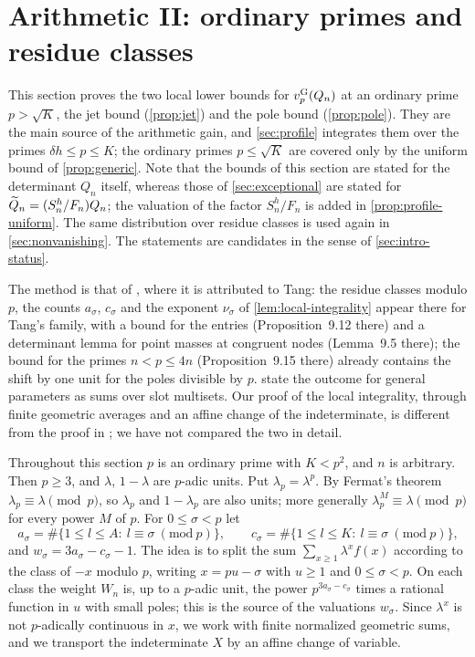 \section{Arithmetic II: ordinary primes and residue classes}\label{sec:ordinary}

This section proves the two local lower bounds for $v^{\mathrm{G}}_{p}(Q_n)$ at an ordinary prime $p>\sqrt K$, the jet bound (\cref{prop:jet}) and the pole bound (\cref{prop:pole}). They are the main source of the arithmetic gain, and \cref{sec:profile} integrates them over the primes $\delta h\le p\le K$; the ordinary primes $p\le\sqrt K$ are covered only by the uniform bound of \cref{prop:generic}. Note that the bounds of this section are stated for the determinant $Q_n$ itself, whereas those of \cref{sec:exceptional} are stated for $\widetilde{Q}_n=(S_n^h/F_n)Q_n$; the valuation of the factor $S_n^h/F_n$ is added in \cref{prop:profile-uniform}. The same distribution over residue classes is used again in \cref{sec:nonvanishing}. The statements are candidates in the sense of \cref{sec:intro-status}.

The method is that of \cite[Sections~9.8 and~9.9]{Litsey2026Li2}, where it is attributed to Tang: the residue classes modulo $p$, the counts $a_\sigma$, $c_\sigma$ and the exponent $\nu_\sigma$ of \cref{lem:local-integrality} appear there for Tang's family, with a bound for the entries (Proposition~9.12 there) and a determinant lemma for point masses at congruent nodes (Lemma~9.5 there); the bound for the primes $n<p\le4n$ (Proposition~9.15 there) already contains the shift by one unit for the poles divisible by $p$.  state the outcome for general parameters as sums over slot multisets. Our proof of the local integrality, through finite geometric averages and an affine change of the indeterminate, is different from the proof in \cite{Litsey2026Li2}; we have not compared the two in detail.

Throughout this section $p$ is an ordinary prime with $K<p^2$, and $n$ is arbitrary. Then $p\ge3$, and $\lambda$, $1-\lambda$ are $p$-adic units. Put $\lambda_p=\lambda^p$. By Fermat's theorem $\lambda_p\equiv\lambda\pmod p$, so $\lambda_p$ and $1-\lambda_p$ are also units; more generally $\lambda_p^M\equiv\lambda\pmod p$ for every power $M$ of $p$. For $0\le\sigma<p$ let
\[
a_\sigma=\#\{1\le l\le A:\ l\equiv\sigma\ (\mathrm{mod}\ p)\},\qquad c_\sigma=\#\{1\le l\le K:\ l\equiv\sigma\ (\mathrm{mod}\ p)\},
\]
and $w_\sigma=3a_\sigma-c_\sigma-1$.
The idea is to split the sum $\sum_{x\ge1}\lambda^x f(x)$ according to the class of $-x$ modulo $p$, writing $x=pu-\sigma$ with $u\ge1$ and $0\le\sigma<p$. On each class the weight $W_n$ is, up to a $p$-adic unit, the power $p^{3a_\sigma-c_\sigma}$ times a rational function in $u$ with small poles; this is the source of the valuations $w_\sigma$. Since $\lambda^x$ is not $p$-adically continuous in $x$, we work with finite normalized geometric sums, and we transport the indeterminate $X$ by an affine change of variable.


